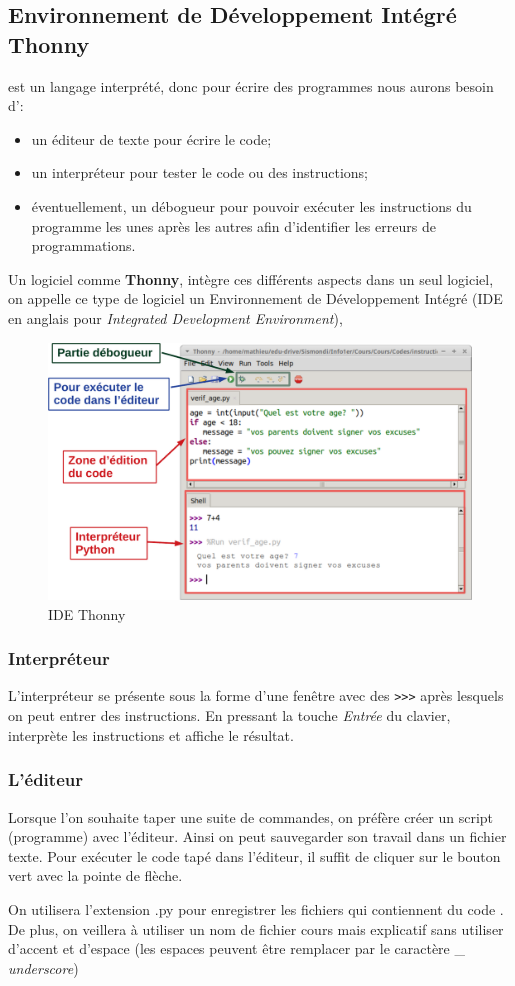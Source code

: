 \subsection{Environnement de Développement Intégré Thonny}
\py est un langage interprété, donc pour écrire des programmes \py nous aurons besoin d':
\begin{itemize}
	\item un éditeur de texte pour écrire le code;
	\item un interpréteur \py pour tester le code ou des instructions;
	\item éventuellement, un débogueur pour pouvoir exécuter les instructions du programme les unes après les autres afin d'identifier les erreurs de programmations.
\end{itemize}
Un logiciel comme \textbf{Thonny}, intègre ces différents aspects dans un seul logiciel, on appelle ce type de logiciel un  Environnement de  Développement Intégré (IDE en anglais pour \textit{Integrated Development Environment}),
\begin{figure}[!h]
	\centering
	\includegraphics[scale=0.5]{Images/IDE_Thonny_illustre-crop.pdf}
	\caption{IDE Thonny}
\end{figure}
\subsubsection{Interpréteur \py}
L'interpréteur \py se présente sous la forme d’une fenêtre avec des \lstinline{>>>} après lesquels on peut entrer des instructions. En pressant la touche \textit{Entrée} du clavier, \py interprète les instructions et affiche le résultat.

\subsubsection{L'éditeur}
Lorsque l'on souhaite taper une suite de commandes, on préfère créer un script (programme) avec l'éditeur. Ainsi on peut sauvegarder son travail dans un fichier texte. Pour exécuter le code tapé dans l'éditeur, il suffit de cliquer sur le bouton vert avec la pointe de flèche.
\begin{important}
	On utilisera l'extension .py pour enregistrer les fichiers qui contiennent du code \py. De plus, on veillera à utiliser un nom de fichier cours mais explicatif sans utiliser d'accent et d'espace (les espaces peuvent être remplacer par le caractère \_ \textit{underscore})
\end{important}


